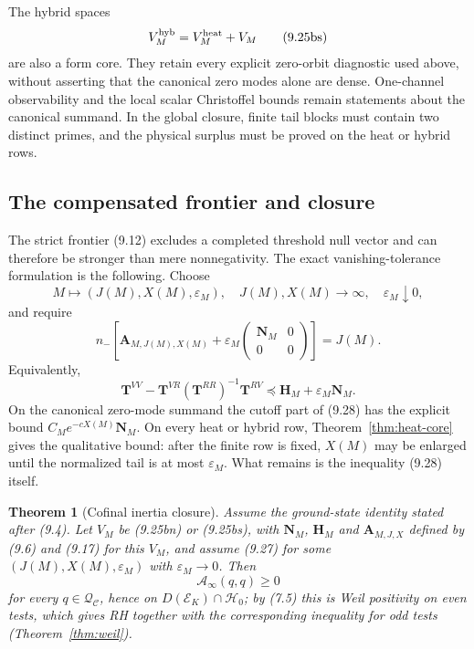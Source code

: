 \documentclass[11pt]{amsart}
\newtheorem{theorem}{Theorem}[section]
\theoremstyle{definition}
\theoremstyle{remark}
\begin{document}
The hybrid spaces
\[
 V_M^{\rm hyb}=V_M^{\rm heat}+V_M
\tag{9.25bs}
\]
are also a form core.  They retain every explicit zero-orbit diagnostic
used above, without asserting that the canonical zero modes alone are
dense.  One-channel observability and the local scalar Christoffel bounds
remain statements about the canonical summand.  In the global closure,
finite tail blocks must contain two distinct primes, and the physical
surplus must be proved on the heat or hybrid rows.

\subsection{The compensated frontier and closure}

The strict frontier (9.12) excludes a completed threshold null vector and
can therefore be stronger than mere nonnegativity.  The exact
vanishing-tolerance formulation is the following.  Choose
\[
 M\longmapsto(J(M),X(M),\varepsilon_M),
\quad J(M),X(M)\to\infty,\quad\varepsilon_M\downarrow0,
\tag{9.26}
\]
and require
\[
 \boxed{
 n_-\!\left[
 \mathbf A_{M,J(M),X(M)}
 +\varepsilon_M
 \begin{pmatrix}\mathbf N_M&0\\0&0\end{pmatrix}
 \right]=J(M).}
\tag{9.27}
\]
Equivalently,
\[
 \boxed{
 \mathbf T^{VV}
 -\mathbf T^{VR}(\mathbf T^{RR})^{-1}\mathbf T^{RV}
 \preceq\mathbf H_M+\varepsilon_M\mathbf N_M.}
\tag{9.28}
\]
On the canonical zero-mode summand the cutoff part of (9.28) has the
explicit bound \(C_Me^{-cX(M)}\mathbf N_M\).  On every heat or hybrid row,
Theorem~\ref{thm:heat-core} gives the qualitative bound: after the finite
row is fixed, \(X(M)\) may be enlarged until the normalized tail is at most
\(\varepsilon_M\).  What remains is the inequality (9.28) itself.

\begin{theorem}[Cofinal inertia closure]
\label{thm:cofinal-inertia-closure}
Assume the ground-state identity stated after (9.4).  Let \(V_M\) be (9.25bn) or (9.25bs), with \(\mathbf N_M\),
\(\mathbf H_M\) and \(\mathbf A_{M,J,X}\) defined by (9.6) and (9.17)
for this \(V_M\), and assume (9.27) for some \((J(M),X(M),\varepsilon_M)\)
with \(\varepsilon_M\to0\).  Then
\[
 \mathcal A_\infty(q,q)\ge0
\tag{9.29}
\]
for every \(q\in\mathcal Q_{\mathscr C}\), hence on
\(D(\mathscr E_K)\cap\mathcal H_0\); by (7.5) this is Weil positivity on
even tests, which gives RH together with the corresponding inequality for
odd tests (Theorem~\ref{thm:weil}).
\end{theorem}
\end{document}
